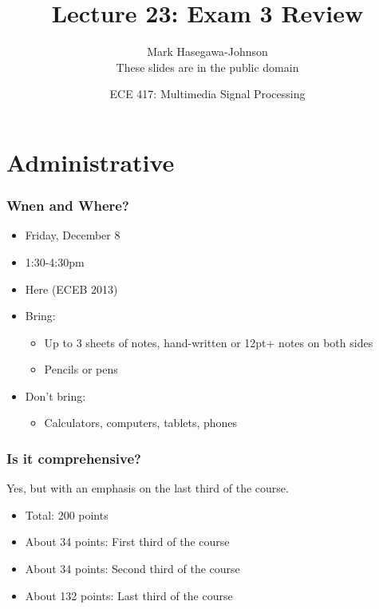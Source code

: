 \documentclass{beamer}
\title{Lecture 23: Exam 3 Review}
\author{Mark Hasegawa-Johnson\\These slides are in the public domain}
\date{ECE 417: Multimedia Signal Processing}
\institute{University of Illinois}
\begin{document}
\begin{frame}
  \maketitle
\end{frame}

\begin{frame}
  \tableofcontents
\end{frame}

\section[Overview]{Administrative}
\setcounter{subsection}{1}

\begin{frame}
  \frametitle{Wnen and Where?}
  \begin{itemize}
  \item Friday, December 8
  \item 1:30-4:30pm
  \item Here (ECEB 2013)
  \end{itemize}
\end{frame}

\begin{frame}

  \begin{itemize}
  \item Bring:
    \begin{itemize}
    \item Up to 3 sheets of notes, hand-written or 12pt+ notes on both sides
    \item Pencils or pens
    \end{itemize}
  \item Don't bring:
    \begin{itemize}
    \item Calculators, computers, tablets, phones
    \end{itemize}
  \end{itemize}
\end{frame}

\begin{frame}
  \frametitle{Is it comprehensive?}

  Yes, but with an emphasis on the last third of the course.
  \begin{itemize}
  \item Total: 200 points
  \item About 34 points: First third of the course
  \item About 34 points: Second third of the course
  \item About 132 points: Last third of the course
  \end{itemize}
\end{frame}
\end{document}
